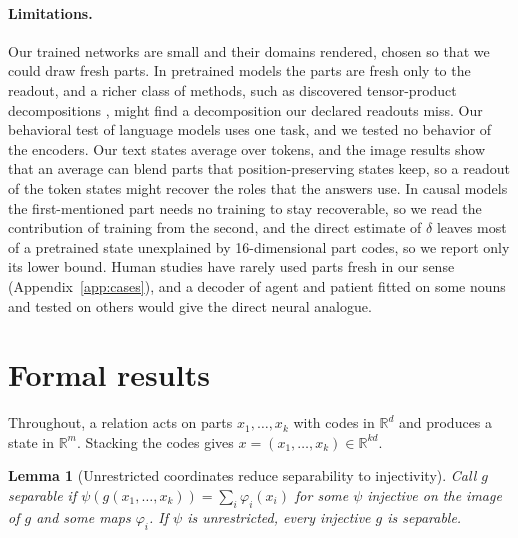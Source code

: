 \documentclass[10pt]{article}
\theoremstyle{plain}
\newtheorem{lemma}{Lemma}
\theoremstyle{remark}
\newcommand{\R}{\mathbb{R}}
\begin{document}
\paragraph{Limitations.} Our trained networks are small and their domains rendered, chosen so that we could draw fresh parts. In pretrained models the parts are fresh only to the readout, and a richer class of methods, such as discovered tensor-product decompositions \citep{soulos2020}, might find a decomposition our declared readouts miss. Our behavioral test of language models uses one task, and we tested no behavior of the encoders. Our text states average over tokens, and the image results show that an average can blend parts that position-preserving states keep, so a readout of the token states might recover the roles that the answers use. In causal models the first-mentioned part needs no training to stay recoverable, so we read the contribution of training from the second, and the direct estimate of $\delta$ leaves most of a pretrained state unexplained by 16-dimensional part codes, so we report only its lower bound. Human studies have rarely used parts fresh in our sense (Appendix~\ref{app:cases}), and a decoder of agent and patient \citep{frankland2015} fitted on some nouns and tested on others would give the direct neural analogue.

\FloatBarrier



\clearpage
\appendix
\makeatletter\let\@fb@secFB\relax\makeatother %

\section{Formal results}
\label{app:proofs}

Throughout, a relation acts on parts $x_1, \ldots, x_k$ with codes in $\R^d$ and produces a state in $\R^m$. Stacking the codes gives $x = (x_1, \ldots, x_k) \in \R^{kd}$.



\begin{lemma}[Unrestricted coordinates reduce separability to injectivity]
\label{lem:psi}
Call $g$ separable if $\psi(g(x_1, \ldots, x_k)) = \sum_i \varphi_i(x_i)$ for some $\psi$ injective on the image of $g$ and some maps $\varphi_i$. If $\psi$ is unrestricted, every injective $g$ is separable.
\end{lemma}
\end{document}
